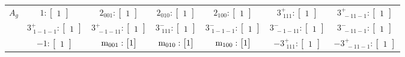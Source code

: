 \documentclass[fleqn,8pt,landscape]{jsarticle}
\begin{document}
\begin{longtable}{ccccccc}
$ A_{g} $ & $ 1:\begin{bmatrix} 1 \end{bmatrix} $ & $ 2{}_{001}:\begin{bmatrix} 1 \end{bmatrix} $ & $ 2{}_{010}:\begin{bmatrix} 1 \end{bmatrix} $ & $ 2{}_{100}:\begin{bmatrix} 1 \end{bmatrix} $ & $ 3^{+}_{\,\,111}:\begin{bmatrix} 1 \end{bmatrix} $ & $ 3^{+}_{\,\,-11-1}:\begin{bmatrix} 1 \end{bmatrix} $ \\
& $ 3^{+}_{\,\,1-1-1}:\begin{bmatrix} 1 \end{bmatrix} $ & $ 3^{+}_{\,\,-1-11}:\begin{bmatrix} 1 \end{bmatrix} $ & $ 3^{-}_{\,\,111}:\begin{bmatrix} 1 \end{bmatrix} $ & $ 3^{-}_{\,\,1-1-1}:\begin{bmatrix} 1 \end{bmatrix} $ & $ 3^{-}_{\,\,-1-11}:\begin{bmatrix} 1 \end{bmatrix} $ & $ 3^{-}_{\,\,-11-1}:\begin{bmatrix} 1 \end{bmatrix} $ \\
& $ -1:\begin{bmatrix} 1 \end{bmatrix} $ & $ {\rm m}_{001}:\begin{bmatrix} 1 \end{bmatrix} $ & $ {\rm m}_{010}:\begin{bmatrix} 1 \end{bmatrix} $ & $ {\rm m}_{100}:\begin{bmatrix} 1 \end{bmatrix} $ & $ -3^{+}_{\,\,111}:\begin{bmatrix} 1 \end{bmatrix} $ & $ -3^{+}_{\,\,-11-1}:\begin{bmatrix} 1 \end{bmatrix} $ \\

\end{longtable}
\end{document}
